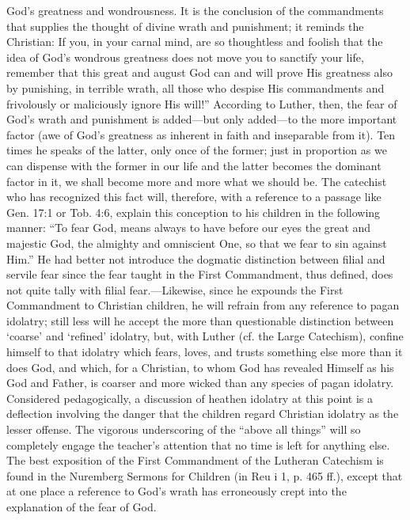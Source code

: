 God’s greatness and wondrousness. It is the conclusion of the commandments that supplies the thought of divine wrath and punishment; it reminds the Christian: If you, in your carnal mind, are so thoughtless and foolish that the idea of God’s wondrous greatness does not move you to sanctify your life, remember that this great and august God can and will prove His greatness also by punishing, in terrible wrath, all those who despise His commandments and frivolously or maliciously ignore His will!” According to Luther, then, the fear of God’s wrath and punishment is added—but only added—to the more important factor (awe of God’s greatness as inherent in faith and inseparable from it). Ten times he speaks of the latter, only once of the former; just in proportion as we can dispense with the former in our life and the latter becomes the dominant factor in it, we shall become more and more what we should be. The catechist who has recognized this fact will, therefore, with a reference to a passage like Gen. 17:1 or Tob. 4:6, explain this conception to his children in the following manner: “To fear God, means always to have before our eyes the great and majestic God, the almighty and omniscient One, so that we fear to sin against Him.” He had better not introduce the dogmatic distinction between filial and servile fear since the fear taught in the First Commandment, thus defined, does not quite tally with filial fear.—Likewise, since he expounds the First Commandment to Christian children, he will refrain from any reference to pagan idolatry; still less will he accept the more than questionable distinction between ‘coarse’ and ‘refined’ idolatry, but, with Luther (cf. the Large Catechism), confine himself to that idolatry which fears, loves, and trusts something else more than it does God, and which, for a Christian, to whom God has revealed Himself as his God and Father, is coarser and more wicked than any species of pagan idolatry. Considered pedagogically, a discussion of heathen idolatry at this point is a deflection involving the danger that the children regard Christian idolatry as the lesser offense. The vigorous underscoring of the “above all things” will so completely engage the teacher’s attention that no time is left for anything else. The best exposition of the First Commandment of the Lutheran Catechism is found in the Nuremberg Sermons for Children (in Reu i 1, p. 465 ff.), except that at one place a reference to God’s wrath has erroneously crept into the explanation of the fear of God.

